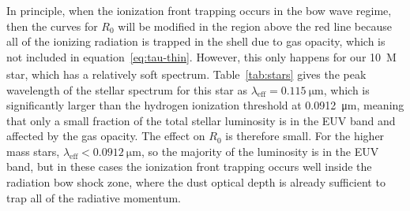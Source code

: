 In principle, when the ionization front trapping occurs in the bow
wave regime, then the curves for \(R_0\) will be modified in the
region above the red line because all of the ionizing radiation is
trapped in the shell due to gas opacity, which is not included in
equation~\eqref{eq:tau-thin}.  However, this only happens for our
\SI{10}{M_\odot} star, which has a relatively soft spectrum.
Table~\ref{tab:stars} gives the peak wavelength of the stellar
spectrum for this star as \(\lambda_{\text{eff}} = \SI{0.115}{\um}\), which
is significantly larger than the hydrogen ionization threshold at
\SI{0.0912}{\um}, meaning that only a small fraction of the total
stellar luminosity is in the EUV band and affected by the gas opacity.
The effect on \(R_0\) is therefore small.  For the higher mass stars,
\(\lambda_{\text{eff}} < \SI{0.0912}{\um}\), so the majority of the
luminosity is in the EUV band, but in these cases the ionization front
trapping occurs well inside the radiation bow shock zone, where the
dust optical depth is already sufficient to trap all of the radiative
momentum.

